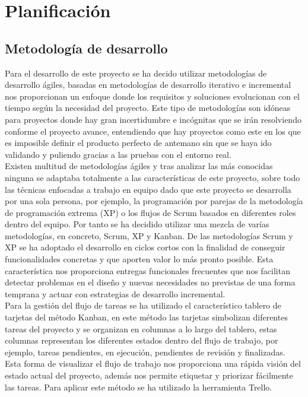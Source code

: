 \documentclass[../proyecto.tex]{subfiles}
\begin{document}
\chapter{Planificación}\label{chap:planificacion}

\section{Metodología de desarrollo}

Para el desarrollo de este proyecto se ha decido utilizar metodologías de desarrollo ágiles, basadas en metodologías de desarrollo iterativo e incremental nos proporcionan un enfoque donde los requisitos y soluciones evolucionan con el tiempo según la necesidad del proyecto. Este tipo de metodologías son idóneas para proyectos donde hay gran incertidumbre e incógnitas que se irán resolviendo conforme el proyecto avance,  entendiendo que hay proyectos como este en los que es imposible definir el producto perfecto de antemano sin que se haya ido validando y puliendo gracias a las pruebas con el entorno real.\\

Existen multitud de metodologías ágiles y tras analizar las más conocidas ninguna se adaptaba totalmente a las características de este proyecto, sobre todo las técnicas enfocadas a trabajo en equipo dado que este proyecto se desarrolla por una sola persona, por ejemplo, la programación por parejas de la metodología de programación extrema (XP) o los flujos de Scrum basados en diferentes roles dentro del equipo. Por tanto se ha decidido utilizar una mezcla de varías metodologías, en concreto, Scrum, XP y Kanban. De las metodologías Scrum y XP se ha adoptado el desarrollo en ciclos cortos con la finalidad de conseguir funcionalidades concretas y que aporten valor lo más pronto posible. Esta característica nos proporciona entregas funcionales frecuentes que nos facilitan detectar problemas en el diseño y nuevas necesidades no previstas de una forma temprana y actuar con estrategias de desarrollo incremental.\\

Para la gestión del flujo de tareas se ha utilizado el característico tablero de tarjetas del método Kanban, en este método las tarjetas simbolizan diferentes tareas del proyecto y se organizan en columnas a lo largo del tablero, estas columnas representan los diferentes estados dentro del flujo de trabajo, por ejemplo, tareas pendientes, en ejecución, pendientes de revisión y finalizadas. Esta forma de visualizar el flujo de trabajo nos proporciona una rápida visión del estado actual del proyecto, además nos permite etiquetar y priorizar fácilmente las tareas. Para aplicar este método se ha utilizado la herramienta Trello.\\
\end{document}
